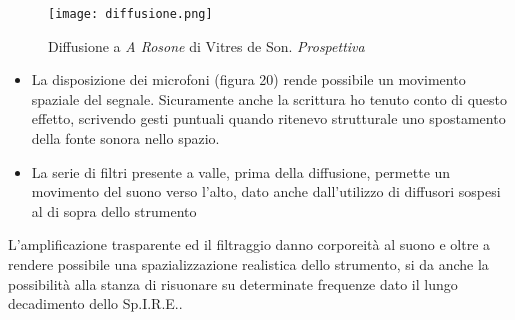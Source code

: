 \begin{figure}[htbp]
\begin{center}
\texttt{[image: diffusione.png]}
\caption{Diffusione a \textit{A Rosone} di Vitres de Son. \textit{Prospettiva}}
\label{default}
\end{center}
\end{figure}

\begin{itemize}
\item{La disposizione dei microfoni (figura 20) rende possibile un movimento spaziale del segnale. Sicuramente anche la scrittura ho tenuto conto di questo effetto, scrivendo gesti puntuali quando ritenevo strutturale uno spostamento della fonte sonora nello spazio.}
\item{La serie di filtri presente a valle, prima della diffusione, permette un movimento del suono verso l'alto, dato anche dall'utilizzo di diffusori sospesi al di sopra dello strumento}
\end{itemize}

L'amplificazione trasparente ed il filtraggio danno corporeità al suono e oltre a rendere possibile una spazializzazione realistica dello strumento, si da anche la possibilità alla stanza di risuonare su determinate frequenze dato il lungo decadimento dello Sp.I.R.E..
